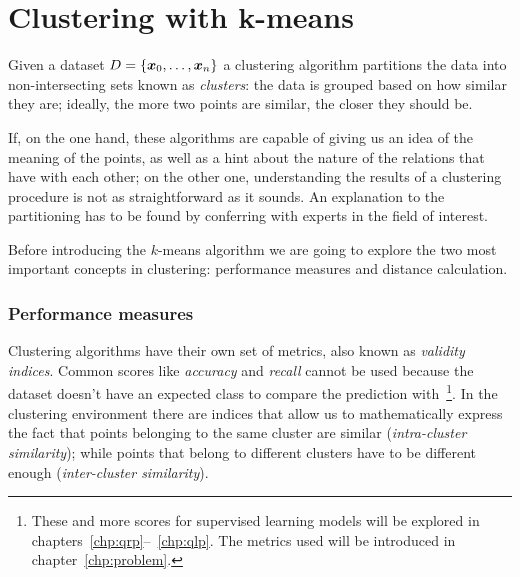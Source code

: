 \section{Clustering with k-means}
\label{sec:kmeans}
Given a dataset $D = \{\boldsymbol{x}_0, \allowbreak\ldots\allowbreak, \boldsymbol{x}_n\}$ a clustering algorithm partitions the data into non-intersecting sets
known as \emph{clusters}: the data is grouped based on how similar they are; ideally, the more two
points are similar, the closer they should be.

If, on the one hand, these algorithms are capable of giving us an idea of the
meaning of the points, as well as a hint about the nature of the relations that have with each
other; on the other one, understanding the results of a clustering procedure is not as
straightforward as it sounds. An explanation to the partitioning has to be found by conferring with
experts in the field of interest.

Before introducing the $k$-means algorithm we are going to explore the two most important concepts
in clustering: performance measures and distance calculation.

\subsubsection{Performance measures}
\label{ssec:performance-measures}
Clustering algorithms have their own set of metrics, also known as \emph{validity indices}. Common
scores like \emph{accuracy} and \emph{recall} cannot be used because the dataset doesn't have an
expected class to compare the prediction with~\footnote{
	These and more scores for supervised learning models will be explored in
	chapters~\ref{chp:qrp}--~\ref{chp:qlp}. The metrics used will be introduced in
	chapter~\ref{chp:problem}.
}. In the clustering environment there are indices that allow us to mathematically
express the fact that points belonging to the same cluster are similar (\emph{intra-cluster
similarity}); while points that belong to different clusters have to be different enough (\emph{inter-cluster similarity}).

\smallskip

